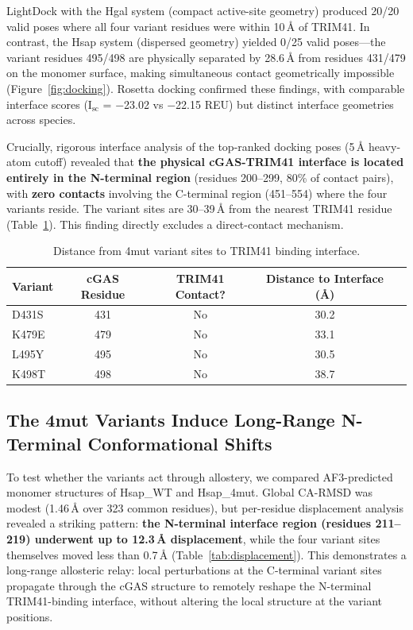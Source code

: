 \documentclass[journal=jcisd8, manuscript=article]{achemso}
\begin{document}
LightDock with the Hgal system (compact active-site geometry) produced 20/20 valid poses where all four variant residues were within 10\,\AA{} of TRIM41. In contrast, the Hsap system (dispersed geometry) yielded 0/25 valid poses---the variant residues 495/498 are physically separated by 28.6\,\AA{} from residues 431/479 on the monomer surface, making simultaneous contact geometrically impossible (Figure~\ref{fig:docking}). Rosetta docking confirmed these findings, with comparable interface scores (I$_{\text{sc}}$ = $-$23.02 vs $-$22.15 REU) but distinct interface geometries across species.

Crucially, rigorous interface analysis of the top-ranked docking poses (5\,\AA{} heavy-atom cutoff) revealed that \textbf{the physical cGAS-TRIM41 interface is located entirely in the N-terminal region} (residues 200--299, 80\% of contact pairs), with \textbf{zero contacts} involving the C-terminal region (451--554) where the four variants reside. The variant sites are 30--39\,\AA{} from the nearest TRIM41 residue (Table~\ref{tab:distances}). This finding directly excludes a direct-contact mechanism.

\begin{table}[htbp]
\centering
\caption{Distance from 4mut variant sites to TRIM41 binding interface.}
\label{tab:distances}
\begin{tabular}{@{}lcccc@{}}
\toprule
Variant & cGAS Residue & TRIM41 Contact? & Distance to Interface (\AA) \\
\midrule
D431S & 431 & No & 30.2 \\
K479E & 479 & No & 33.1 \\
L495Y & 495 & No & 30.5 \\
K498T & 498 & No & 38.7 \\
\bottomrule
\end{tabular}
\end{table}

\subsection{The 4mut Variants Induce Long-Range N-Terminal Conformational Shifts}

To test whether the variants act through allostery, we compared AF3-predicted monomer structures of Hsap\_WT and Hsap\_4mut. Global CA-RMSD was modest (1.46\,\AA{} over 323 common residues), but per-residue displacement analysis revealed a striking pattern: \textbf{the N-terminal interface region (residues 211--219) underwent up to 12.3\,\AA{} displacement}, while the four variant sites themselves moved less than 0.7\,\AA{} (Table~\ref{tab:displacement}). This demonstrates a long-range allosteric relay: local perturbations at the C-terminal variant sites propagate through the cGAS structure to remotely reshape the N-terminal TRIM41-binding interface, without altering the local structure at the variant positions.
\end{document}
